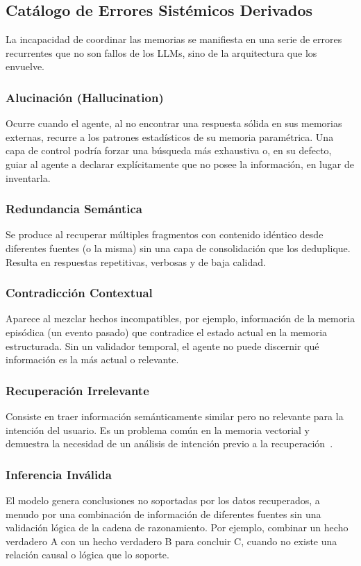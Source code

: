 \documentclass[journal,onecolumn]{IEEEtran}
\begin{document}
\subsection{Catálogo de Errores Sistémicos Derivados}
La incapacidad de coordinar las memorias se manifiesta en una serie de errores recurrentes que no son fallos de los LLMs, sino de la arquitectura que los envuelve.

\subsubsection{Alucinación (Hallucination)}
Ocurre cuando el agente, al no encontrar una respuesta sólida en sus memorias externas, recurre a los patrones estadísticos de su memoria paramétrica. Una capa de control podría forzar una búsqueda más exhaustiva o, en su defecto, guiar al agente a declarar explícitamente que no posee la información, en lugar de inventarla.

\subsubsection{Redundancia Semántica}
Se produce al recuperar múltiples fragmentos con contenido idéntico desde diferentes fuentes (o la misma) sin una capa de consolidación que los deduplique. Resulta en respuestas repetitivas, verbosas y de baja calidad.

\subsubsection{Contradicción Contextual}
Aparece al mezclar hechos incompatibles, por ejemplo, información de la memoria episódica (un evento pasado) que contradice el estado actual en la memoria estructurada. Sin un validador temporal, el agente no puede discernir qué información es la más actual o relevante.

\subsubsection{Recuperación Irrelevante}
Consiste en traer información semánticamente similar pero no relevante para la intención del usuario. Es un problema común en la memoria vectorial y demuestra la necesidad de un análisis de intención previo a la recuperación~\cite{gao2023retrieval}.

\subsubsection{Inferencia Inválida}
El modelo genera conclusiones no soportadas por los datos recuperados, a menudo por una combinación de información de diferentes fuentes sin una validación lógica de la cadena de razonamiento. Por ejemplo, combinar un hecho verdadero A con un hecho verdadero B para concluir C, cuando no existe una relación causal o lógica que lo soporte.
\end{document}
